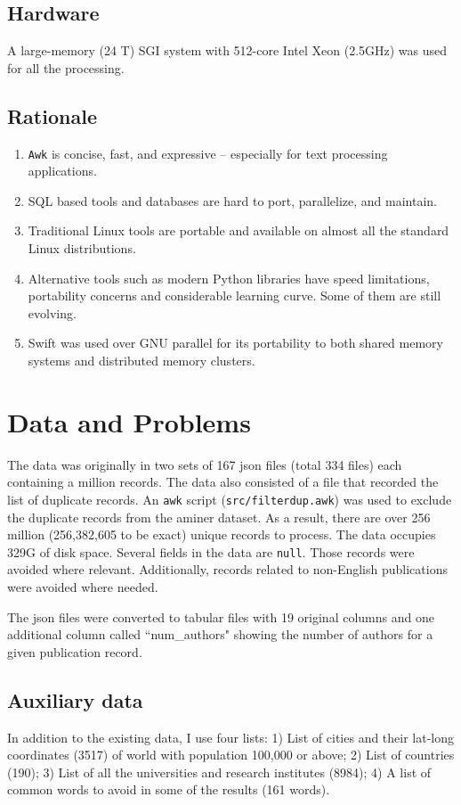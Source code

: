 \documentclass{article}
\begin{document}
\subsection*{Hardware}
A large-memory (24 T) SGI system with 512-core Intel Xeon (2.5GHz) was used for
all the processing.

\subsection*{Rationale}
\begin{enumerate}
\item \texttt{Awk} is concise, fast, and expressive -- especially for text processing applications.
\item SQL based tools and databases are hard to port, parallelize, and maintain.
\item Traditional Linux tools are portable and available on almost all the standard Linux distributions.
\item Alternative tools such as modern Python libraries have speed limitations, portability concerns and considerable learning curve. Some of them are still evolving.
\item Swift was used over GNU parallel for its portability to both shared memory systems and distributed memory clusters.
\end{enumerate}

\section*{Data and Problems}
The data was originally in two sets of 167 json files (total 334 files) each
containing a million records. The data also consisted of a file that recorded
the list of duplicate records. An \texttt{awk} script
(\texttt{src/filterdup.awk}) was used to exclude the duplicate records from the
aminer dataset. As a result, there are over 256 million (256,382,605 to be
exact) unique records to process. The data occupies 329G of disk space. Several
fields in the data are \texttt{null}. Those records were avoided where
relevant. Additionally, records related to non-English publications were
avoided where needed.

The json files were converted to tabular files with 19 original columns and one
additional column called ``num\_authors" showing the number of authors for a given
publication record.

\subsection*{Auxiliary data}
In addition to the existing data, I use four lists: 1) List of cities and their
lat-long coordinates (3517) of world with population 100,000 or above; 2) List
of countries (190); 3) List of all the universities and research institutes
(8984); 4) A list of common words to avoid in some of the results (161 words).
\end{document}
